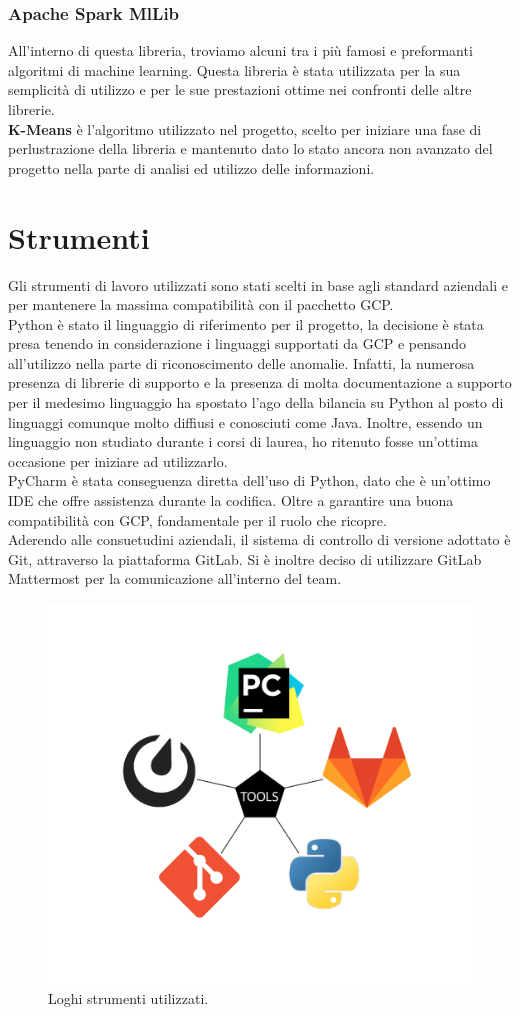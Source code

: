 \subsubsection{Apache Spark MlLib}
All'interno di questa libreria, troviamo alcuni tra i più famosi e preformanti algoritmi di machine learning. Questa libreria è stata utilizzata per la sua semplicità di utilizzo e per le sue prestazioni ottime nei confronti delle altre librerie.
\\
\textbf{K-Means} \cite{k-means} è  l'algoritmo utilizzato nel progetto, scelto per iniziare una fase di perlustrazione della libreria e mantenuto dato lo stato ancora non avanzato del progetto nella parte di analisi ed utilizzo delle informazioni.
\section{Strumenti}
Gli strumenti di lavoro utilizzati sono stati scelti in base agli standard aziendali e per mantenere la massima compatibilità con il pacchetto GCP.
\\
Python è stato il linguaggio di riferimento per il progetto, la decisione è stata presa tenendo in considerazione i linguaggi supportati da GCP e pensando all'utilizzo nella parte di riconoscimento delle anomalie. Infatti, la numerosa presenza di librerie di supporto e la presenza di molta documentazione a supporto per il medesimo linguaggio ha spostato l'ago della bilancia su Python al posto di linguaggi comunque molto diffiusi e conosciuti come Java. Inoltre, essendo un linguaggio non studiato durante i corsi di laurea, ho ritenuto fosse un'ottima occasione per iniziare ad utilizzarlo.
\\
PyCharm è stata conseguenza diretta dell'uso di Python, dato che è un'ottimo IDE che offre assistenza durante la codifica. Oltre a garantire una buona compatibilità con GCP, fondamentale per il ruolo che ricopre.
\\
Aderendo alle consuetudini aziendali, il sistema di controllo di versione adottato è Git, attraverso la piattaforma GitLab. Si è inoltre deciso di utilizzare GitLab Mattermost per la comunicazione all'interno del team.

\begin{figure}[h!]
	\centering
	\includegraphics[scale=0.4]{figures/pentagono_grande-03}
	\caption[Loghi strumenti utilizzati	.]{Loghi strumenti utilizzati.
		\label{fig:loghi}}
\end{figure}	